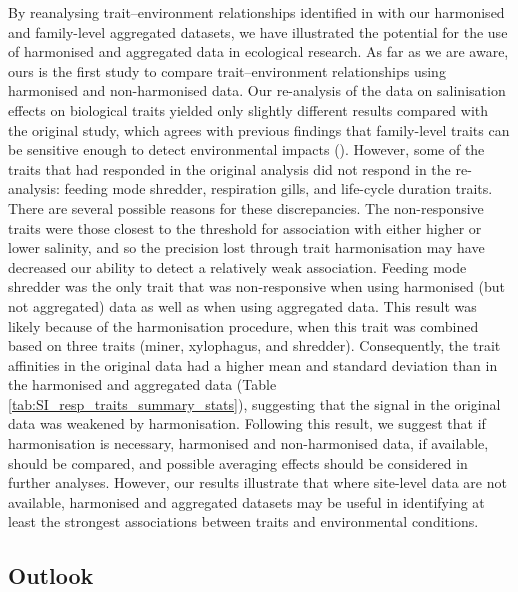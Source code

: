 \documentclass{article}
\begin{document}
By reanalysing trait–environment relationships identified in \citet{szocs_effects_2014} with our harmonised and family-level aggregated datasets, we have illustrated the potential for the use of harmonised and aggregated data in ecological research. As far as we are aware, ours is the first study to compare trait–environment relationships using harmonised and non-harmonised data.
Our re-analysis of the data on salinisation effects on biological traits yielded only slightly different results compared with the original study, which agrees with previous findings that family-level traits can be sensitive enough to detect environmental impacts (\cite{beketov_spear_2009}). However, some of the traits that had responded in the original analysis did not respond in the re-analysis: feeding mode shredder, respiration gills, and life-cycle duration traits. There are several possible reasons for these discrepancies. The non-responsive traits were those closest to the threshold for association with either higher or lower salinity, and so the precision lost through trait harmonisation may have decreased our ability to detect a relatively weak association. Feeding mode shredder was the only trait that was non-responsive when using harmonised (but not aggregated) data as well as when using aggregated data.
This result was likely because of the harmonisation procedure, when this trait was combined based on three traits (miner, xylophagus, and shredder). Consequently, the trait affinities in the original data had a higher mean and standard deviation than in the harmonised and aggregated data (Table \ref{tab:SI_resp_traits_summary_stats}), suggesting that the signal in the original data was weakened by harmonisation. Following this result, we suggest that if harmonisation is necessary, harmonised and non-harmonised data, if available, should be compared, and possible averaging effects should be considered in further analyses. However, our results illustrate that where site-level data are not available, harmonised and aggregated datasets may be useful in identifying at least the strongest associations between traits and environmental conditions. 


\subsection*{Outlook}
\end{document}
